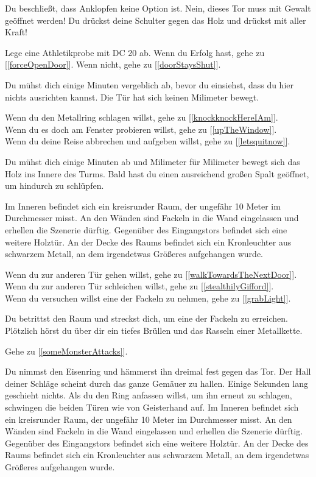 
Du beschließt, dass Anklopfen keine Option ist. Nein, dieses Tor muss mit Gewalt geöffnet werden! Du drückst deine Schulter gegen das Holz und drückst mit aller Kraft!

Lege eine Athletikprobe mit DC 20 ab. Wenn du Erfolg hast, gehe zu [\ref{forceOpenDoor}].
Wenn nicht, gehe zu [\ref{doorStaysShut}].


Du mühst dich einige Minuten vergeblich ab, bevor du einsiehst, dass du hier nichts ausrichten kannst. Die Tür hat sich keinen Milimeter bewegt.

Wenn du den Metallring schlagen willst, gehe zu [\ref{knockknockHereIAm}].
\\Wenn du es doch am Fenster probieren willst, gehe zu [\ref{upTheWindow}].
\\Wenn du deine Reise abbrechen und aufgeben willst, gehe zu [\ref{letsquitnow}].


Du mühst dich einige Minuten ab und Milimeter für Milimeter bewegt sich das Holz ins Innere des Turms. Bald hast du einen ausreichend großen Spalt geöffnet, um hindurch zu schlüpfen.

Im Inneren befindet sich ein kreisrunder Raum, der ungefähr 10 Meter im Durchmesser misst. An den Wänden sind Fackeln in die Wand eingelassen und erhellen die Szenerie dürftig. Gegenüber des Eingangstors befindet sich eine weitere Holztür. An der Decke des Raums befindet sich ein Kronleuchter aus schwarzem Metall, an dem irgendetwas Größeres aufgehangen wurde.

Wenn du zur anderen Tür gehen willst, gehe zu [\ref{walkTowardsTheNextDoor}].
\\Wenn du zur anderen Tür schleichen willst, gehe zu [\ref{stealthilyGifford}].
\\Wenn du versuchen willst eine der Fackeln zu nehmen, gehe zu [\ref{grabLight}].


Du betrittst den Raum und streckst dich, um eine der Fackeln zu erreichen. Plötzlich hörst du über dir ein tiefes Brüllen und das Rasseln einer Metallkette.

Gehe zu [\ref{someMonsterAttacks}].


Du nimmst den Eisenring und hämmerst ihn dreimal fest gegen das Tor. Der Hall deiner Schläge scheint durch das ganze Gemäuer zu hallen. Einige Sekunden lang geschieht nichts. Als du den Ring anfassen willst, um ihn erneut zu schlagen, schwingen die beiden Türen wie von Geisterhand auf. Im Inneren befindet sich ein kreisrunder Raum, der ungefähr 10 Meter im Durchmesser misst. An den Wänden sind Fackeln in die Wand eingelassen und erhellen die Szenerie dürftig. Gegenüber des Eingangstors befindet sich eine weitere Holztür. An der Decke des Raums befindet sich ein Kronleuchter aus schwarzem Metall, an dem irgendetwas Größeres aufgehangen wurde.

